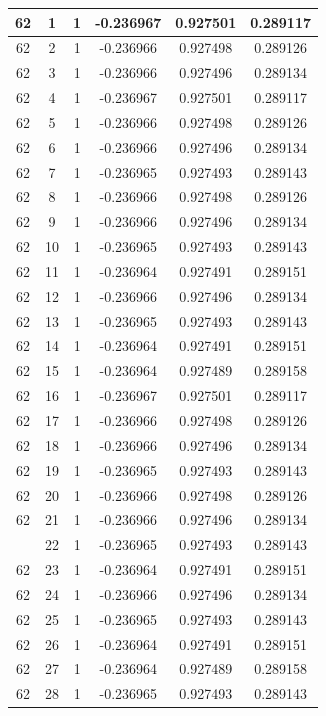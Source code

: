 \documentclass[12pt,a4paper]{article}
\numberwithin{equation}{section}
\numberwithin{figure}{section}
\numberwithin{table}{section}
\begin{document}
\begin{longtable}{|c|c|c|c|c|c|}
62 & 1 & 1 & -0.236967 & 0.927501 & 0.289117 \\ \hline
62 & 2 & 1 & -0.236966 & 0.927498 & 0.289126 \\ \hline
62 & 3 & 1 & -0.236966 & 0.927496 & 0.289134 \\ \hline
62 & 4 & 1 & -0.236967 & 0.927501 & 0.289117 \\ \hline
62 & 5 & 1 & -0.236966 & 0.927498 & 0.289126 \\ \hline
62 & 6 & 1 & -0.236966 & 0.927496 & 0.289134 \\ \hline
62 & 7 & 1 & -0.236965 & 0.927493 & 0.289143 \\ \hline
62 & 8 & 1 & -0.236966 & 0.927498 & 0.289126 \\ \hline
62 & 9 & 1 & -0.236966 & 0.927496 & 0.289134 \\ \hline
62 & 10 & 1 & -0.236965 & 0.927493 & 0.289143 \\ \hline
62 & 11 & 1 & -0.236964 & 0.927491 & 0.289151 \\ \hline
62 & 12 & 1 & -0.236966 & 0.927496 & 0.289134 \\ \hline
62 & 13 & 1 & -0.236965 & 0.927493 & 0.289143 \\ \hline
62 & 14 & 1 & -0.236964 & 0.927491 & 0.289151 \\ \hline
62 & 15 & 1 & -0.236964 & 0.927489 & 0.289158 \\ \hline
62 & 16 & 1 & -0.236967 & 0.927501 & 0.289117 \\ \hline
62 & 17 & 1 & -0.236966 & 0.927498 & 0.289126 \\ \hline
62 & 18 & 1 & -0.236966 & 0.927496 & 0.289134 \\ \hline
62 & 19 & 1 & -0.236965 & 0.927493 & 0.289143 \\ \hline
62 & 20 & 1 & -0.236966 & 0.927498 & 0.289126 \\ \hline
62 & 21 & 1 & -0.236966 & 0.927496 & 0.289134 \\ \hline
\pagebreak
62 & 22 & 1 & -0.236965 & 0.927493 & 0.289143 \\ \hline
62 & 23 & 1 & -0.236964 & 0.927491 & 0.289151 \\ \hline
62 & 24 & 1 & -0.236966 & 0.927496 & 0.289134 \\ \hline
62 & 25 & 1 & -0.236965 & 0.927493 & 0.289143 \\ \hline
62 & 26 & 1 & -0.236964 & 0.927491 & 0.289151 \\ \hline
62 & 27 & 1 & -0.236964 & 0.927489 & 0.289158 \\ \hline
62 & 28 & 1 & -0.236965 & 0.927493 & 0.289143 \\ \hline

\end{longtable}
\end{document}
